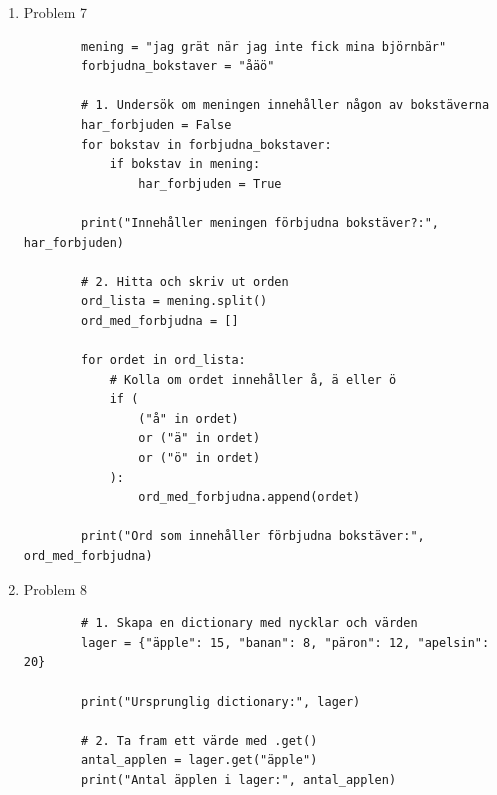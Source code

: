 \documentclass[11pt,a4paper]{article}
\begin{document}
\begin{enumerate}
\begin{lstlisting}
        # Funktion med standardvärde step=1
        def generera_x(start, stop, step=1):
            return list(range(start, stop, step))

        # 1. Standardläge (steg 1)
        x_val = generera_x(0, 10)
        y_val = [x**2 for x in x_val]

        # 2. Om användaren anger eget steg (t.ex. steg 2)
        x_anpassad = generera_x(0, 10, step=2)
        y_anpassad = [x**2 for x in x_anpassad]

        # Rita grafen
        plt.plot(x_val, y_val, label="Standard (steg 1)")
        plt.plot(x_anpassad, y_anpassad, label="Anpassad (steg 2)")

        plt.title("Graf med range() och Matplotlib")
        plt.xlabel("x")
        plt.ylabel("y")
        plt.legend()
        plt.grid(True)
        plt.show()
    \end{lstlisting}
    \item Problem 7
    \begin{lstlisting}
        mening = "jag grät när jag inte fick mina björnbär"
        forbjudna_bokstaver = "åäö"

        # 1. Undersök om meningen innehåller någon av bokstäverna
        har_forbjuden = False
        for bokstav in forbjudna_bokstaver:
            if bokstav in mening:
                har_forbjuden = True

        print("Innehåller meningen förbjudna bokstäver?:", har_forbjuden)

        # 2. Hitta och skriv ut orden
        ord_lista = mening.split()
        ord_med_forbjudna = []

        for ordet in ord_lista:
            # Kolla om ordet innehåller å, ä eller ö
            if (
                ("å" in ordet)
                or ("ä" in ordet)
                or ("ö" in ordet)
            ):
                ord_med_forbjudna.append(ordet)

        print("Ord som innehåller förbjudna bokstäver:", ord_med_forbjudna)
    \end{lstlisting}
    \item Problem 8
    \begin{lstlisting}
        # 1. Skapa en dictionary med nycklar och värden
        lager = {"äpple": 15, "banan": 8, "päron": 12, "apelsin": 20}

        print("Ursprunglig dictionary:", lager)

        # 2. Ta fram ett värde med .get()
        antal_applen = lager.get("äpple")
        print("Antal äpplen i lager:", antal_applen)


\end{lstlisting}
\end{enumerate}
\end{document}
